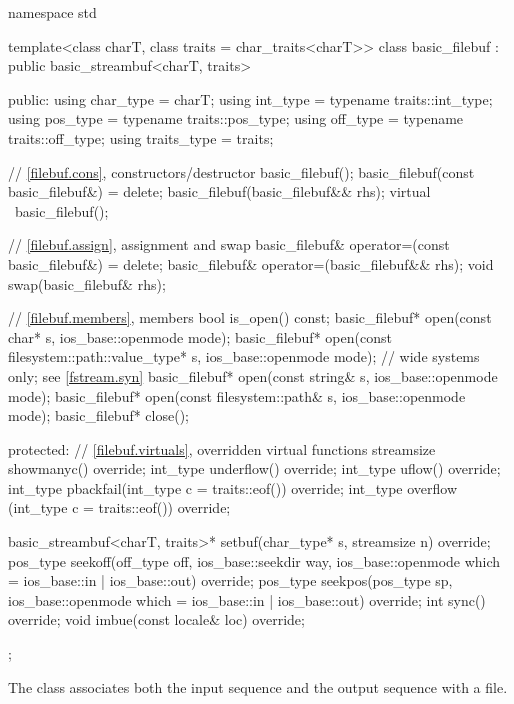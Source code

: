 %
\begin{codeblock}
namespace std {
  template<class charT, class traits = char_traits<charT>>
  class basic_filebuf : public basic_streambuf<charT, traits> {
  public:
    using char_type   = charT;
    using int_type    = typename traits::int_type;
    using pos_type    = typename traits::pos_type;
    using off_type    = typename traits::off_type;
    using traits_type = traits;

    // \ref{filebuf.cons}, constructors/destructor
    basic_filebuf();
    basic_filebuf(const basic_filebuf&) = delete;
    basic_filebuf(basic_filebuf&& rhs);
    virtual ~basic_filebuf();

    // \ref{filebuf.assign}, assignment and swap
    basic_filebuf& operator=(const basic_filebuf&) = delete;
    basic_filebuf& operator=(basic_filebuf&& rhs);
    void swap(basic_filebuf& rhs);

    // \ref{filebuf.members}, members
    bool is_open() const;
    basic_filebuf* open(const char* s, ios_base::openmode mode);
    basic_filebuf* open(const filesystem::path::value_type* s,
                        ios_base::openmode mode);   // wide systems only; see \ref{fstream.syn}
    basic_filebuf* open(const string& s,
                        ios_base::openmode mode);
    basic_filebuf* open(const filesystem::path& s,
                        ios_base::openmode mode);
    basic_filebuf* close();

  protected:
    // \ref{filebuf.virtuals}, overridden virtual functions
    streamsize showmanyc() override;
    int_type underflow() override;
    int_type uflow() override;
    int_type pbackfail(int_type c = traits::eof()) override;
    int_type overflow (int_type c = traits::eof()) override;

    basic_streambuf<charT, traits>* setbuf(char_type* s,
                                           streamsize n) override;
    pos_type seekoff(off_type off, ios_base::seekdir way,
                     ios_base::openmode which
                      = ios_base::in | ios_base::out) override;
    pos_type seekpos(pos_type sp,
                     ios_base::openmode which
                      = ios_base::in | ios_base::out) override;
    int      sync() override;
    void     imbue(const locale& loc) override;
  };
}
\end{codeblock}

\pnum
The class
associates both the input sequence and the output
sequence with a file.

